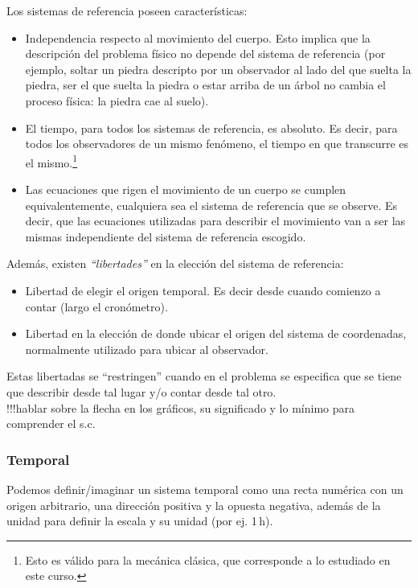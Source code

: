 Los sistemas de referencia poseen características:
\begin{itemize}
  \item Independencia respecto al movimiento del cuerpo. Esto implica que la
    descripción del problema físico no depende del sistema de referencia
    (por ejemplo, soltar un piedra descripto por un observador al lado del que
    suelta la piedra, ser el que suelta la piedra o estar arriba de un árbol no
    cambia el proceso física: la piedra cae al suelo).
  \item El tiempo, para todos los sistemas de referencia, es absoluto. Es decir,
    para todos los observadores de un mismo fenómeno, el tiempo en que
    transcurre es el mismo.\footnote{Esto es válido para la mecánica clásica,
    que corresponde a lo estudiado en este curso.}
  \item Las ecuaciones que rigen el movimiento de un cuerpo se cumplen
    equivalentemente, cualquiera sea el sistema de referencia que se observe.
    Es decir, que las ecuaciones utilizadas para describir el movimiento van a
    ser las mismas independiente del sistema de referencia escogido.
\end{itemize}

Además, existen \textit{``libertades''} en la elección del sistema de referencia:
\begin{itemize}
  \item Libertad de elegir el origen temporal. Es decir desde cuando comienzo a
    contar (largo el cronómetro).
  \item Libertad en la elección de donde ubicar el origen del sistema de
    coordenadas, normalmente utilizado para ubicar al observador.
\end{itemize}
Estas libertadas se ``restringen'' cuando en el problema se especifica que se tiene
que describir desde tal lugar y/o contar desde tal otro.
\\


!!!hablar sobre la flecha en los gráficos, su significado y lo mínimo para
comprender el s.c.

\subsubsection{Temporal}
\label{c.srt}

Podemos definir/imaginar un sistema temporal como una recta numérica con un
origen arbitrario, una dirección positiva y la opuesta negativa, además de la
unidad para definir la escala y su unidad (por ej. 1\,h). 

